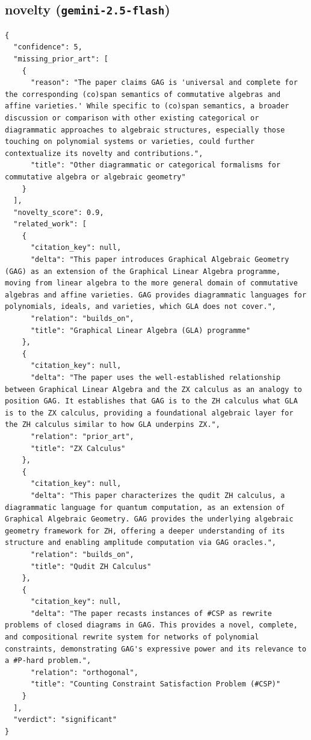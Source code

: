 \documentclass[11pt]{article}
\begin{document}
\subsection*{novelty (\texttt{gemini-2.5-flash})}
\begin{verbatim}
{
  "confidence": 5,
  "missing_prior_art": [
    {
      "reason": "The paper claims GAG is 'universal and complete for the corresponding (co)span semantics of commutative algebras and affine varieties.' While specific to (co)span semantics, a broader discussion or comparison with other existing categorical or diagrammatic approaches to algebraic structures, especially those touching on polynomial systems or varieties, could further contextualize its novelty and contributions.",
      "title": "Other diagrammatic or categorical formalisms for commutative algebra or algebraic geometry"
    }
  ],
  "novelty_score": 0.9,
  "related_work": [
    {
      "citation_key": null,
      "delta": "This paper introduces Graphical Algebraic Geometry (GAG) as an extension of the Graphical Linear Algebra programme, moving from linear algebra to the more general domain of commutative algebras and affine varieties. GAG provides diagrammatic languages for polynomials, ideals, and varieties, which GLA does not cover.",
      "relation": "builds_on",
      "title": "Graphical Linear Algebra (GLA) programme"
    },
    {
      "citation_key": null,
      "delta": "The paper uses the well-established relationship between Graphical Linear Algebra and the ZX calculus as an analogy to position GAG. It establishes that GAG is to the ZH calculus what GLA is to the ZX calculus, providing a foundational algebraic layer for the ZH calculus similar to how GLA underpins ZX.",
      "relation": "prior_art",
      "title": "ZX Calculus"
    },
    {
      "citation_key": null,
      "delta": "This paper characterizes the qudit ZH calculus, a diagrammatic language for quantum computation, as an extension of Graphical Algebraic Geometry. GAG provides the underlying algebraic geometry framework for ZH, offering a deeper understanding of its structure and enabling amplitude computation via GAG oracles.",
      "relation": "builds_on",
      "title": "Qudit ZH Calculus"
    },
    {
      "citation_key": null,
      "delta": "The paper recasts instances of #CSP as rewrite problems of closed diagrams in GAG. This provides a novel, complete, and compositional rewrite system for networks of polynomial constraints, demonstrating GAG's expressive power and its relevance to a #P-hard problem.",
      "relation": "orthogonal",
      "title": "Counting Constraint Satisfaction Problem (#CSP)"
    }
  ],
  "verdict": "significant"
}
\end{verbatim}
\end{document}
